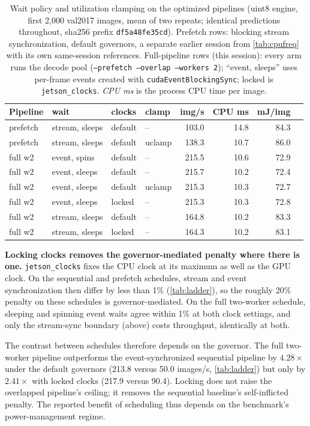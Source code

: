 \begin{table}[t]
\centering
\caption{Wait policy and utilization clamping on the optimized
pipelines (uint8 engine, first 2,000 val2017 images, mean of two
repeats; identical predictions throughout, sha256 prefix
\texttt{df5a48fe35cd}). Prefetch rows: blocking stream
synchronization, default governors, a separate earlier session from
\cref{tab:cpufreq} with its own same-session references. Full-pipeline
rows (this session): every arm runs the decode pool
(\texttt{--prefetch --overlap --workers 2}); ``event, sleeps'' uses
per-frame events created with \texttt{cudaEventBlockingSync}; locked
is \texttt{jetson\_clocks}. \emph{CPU ms} is the process CPU time per
image.}
\label{tab:uclamp2}
\footnotesize
\setlength{\tabcolsep}{2.2pt}
\begin{tabular}{@{}llll rrrr@{}}
\toprule
Pipeline & wait & clocks & clamp & img/s & CPU ms & mJ/img \\
\midrule
prefetch & stream, sleeps & default & --     & 103.0 & 14.8 & 84.3 \\
prefetch & stream, sleeps & default & uclamp & 138.3 & 10.7 & 86.0 \\
\midrule
full w2  & event, spins   & default & --     & 215.5 & 10.6 & 72.9 \\
full w2  & event, sleeps  & default & --     & 215.7 & 10.2 & 72.4 \\
full w2  & event, sleeps  & default & uclamp & 215.3 & 10.3 & 72.7 \\
full w2  & event, sleeps  & locked  & --     & 215.3 & 10.3 & 72.8 \\
full w2  & stream, sleeps & default & --     & 164.8 & 10.2 & 83.3 \\
full w2  & stream, sleeps & locked  & --     & 164.3 & 10.2 & 83.1 \\
\bottomrule
\end{tabular}
\end{table}

\textbf{Locking clocks removes the governor-mediated penalty where
there is one.}
\texttt{jetson\_clocks} fixes the CPU clock at its maximum as well as
the GPU clock. On the sequential and prefetch schedules, stream and
event synchronization then differ by less than 1\% (\cref{tab:ladder}),
so the roughly 20\% penalty on these schedules is governor-mediated. On
the full two-worker schedule, sleeping and spinning event waits agree
within 1\% at both clock settings, and only the stream-sync boundary
(above) costs throughput, identically at both.

The contrast between schedules therefore depends on the governor. The
full two-worker pipeline outperforms the event-synchronized sequential
pipeline by $4.28\times$ under the default governors (213.8 versus
50.0 images/s, \cref{tab:ladder}) but only by $2.41\times$ with locked
clocks (217.9 versus 90.4). Locking does not raise the overlapped
pipeline's ceiling; it removes the sequential baseline's
self-inflicted penalty. The reported benefit of scheduling thus depends
on the benchmark's power-management regime.
